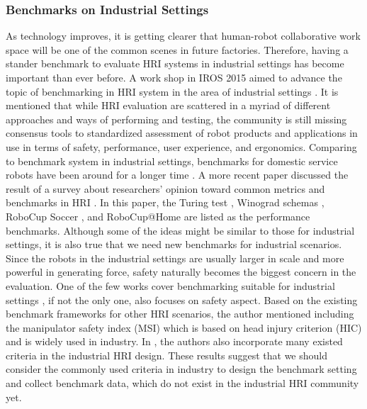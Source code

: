 \subsubsection{Benchmarks on Industrial Settings}

As technology improves, it is getting clearer that human-robot collaborative work space will be one of the common scenes in future factories. Therefore, having a stander benchmark to evaluate HRI systems in industrial settings has become important than ever before. A work shop in IROS 2015 aimed to advance the topic of benchmarking in HRI system in the area of industrial settings \cite{dalgaard2015workshop}. It is mentioned that while HRI evaluation are scattered in a myriad of different approaches and ways of performing and testing, the community is still missing consensus tools to standardized assessment of robot products and applications in use in terms of safety, performance, user experience, and ergonomics. Comparing to benchmark system in industrial settings, benchmarks for domestic service robots
have been around for a longer time \cite{wisspeintner2009robocup}. A more recent paper discussed the result of a survey about researchers' opinion toward common metrics and benchmarks in HRI \cite{aly2017metrics}. In this paper, the Turing test \cite{turing2009computing}, Winograd schemas \cite{levesque2011winograd}, RoboCup Soccer \cite{kitano1998robocup}, and RoboCup@Home \cite{wisspeintner2009robocup} are listed as the performance benchmarks. Although some of the ideas might be similar to those for industrial settings, it is also true that we need new benchmarks for industrial scenarios. Since the robots in the industrial settings are usually larger in scale and more powerful in generating force, safety naturally becomes the biggest concern in the evaluation. One of the few works cover benchmarking suitable for industrial settings \cite{de2008atlas}, if not the only one, also focuses on safety aspect. Based on the existing benchmark frameworks for other HRI scenarios, the author mentioned including the manipulator safety index (MSI) \cite{zinn2004playing} which is based on head injury criterion (HIC) \cite{versace1971review} and is widely used in industry. In \cite{rosen2018evaluation}, the authors also incorporate many existed criteria in the industrial HRI design. These results suggest that we should consider the commonly used criteria in industry to design the benchmark setting and collect benchmark data, which do not exist in the industrial HRI community yet.   

